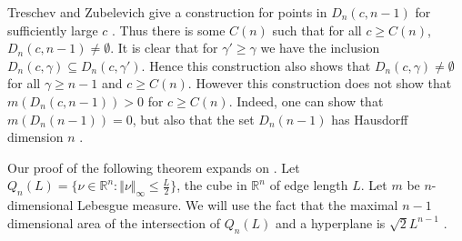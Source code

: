 \documentclass{article}
\newcommand{\norm}[1]{\Vert #1 \Vert}
\begin{document}
Treschev and Zubelevich give a construction for points in $D_n(c,n-1)$ for sufficiently
large $c$ \cite[Theorem 9.2]{treschev}. Thus there is some $C(n)$ such that
for all $c \geq C(n)$, $D_n(c,n-1) \neq \emptyset$. It is clear that for $\gamma' \geq \gamma$ we have the inclusion
$D_n(c,\gamma) \subseteq D_n(c,\gamma')$. Hence this construction
also shows that $D_n(c,\gamma) \neq \emptyset$
for all $\gamma \geq n-1$ and $c \geq C(n)$. However this construction does not show that
$m(D_n(c,n-1))>0$ for $c \geq C(n)$. Indeed, one can show that $m(D_n(n-1))=0$, but also that the set $D_n(n-1)$ has Hausdorff dimension $n$ \cite[p. 5]{poeschel}. 

Our proof of the following theorem expands on \cite[Theorem 9.3]{treschev}.  Let
$Q_n(L)=\{\nu \in \mathbb{R}^n: \norm{\nu}_\infty \leq \frac{L}{2}\}$, the cube in
$\mathbb{R}^n$ of edge length $L$. Let $m$ be $n$-dimensional Lebesgue measure. We will use the fact that the maximal $n-1$ dimensional area of the intersection of $Q_n(L)$ and a hyperplane is $\sqrt{2}L^{n-1}$ \cite{MR840631}.
\end{document}
